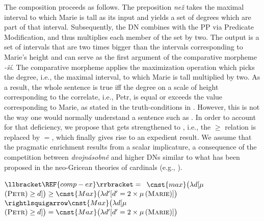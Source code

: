 \documentclass[output=paper,modfonts,hidelinks,newtxmath
\ChapterDOI{10.5281/zenodo.2545513}
]{langscibook}
\begin{document}
\begin{exe}
\ex\label{tree-comp-dvojnasobne}%
%
\end{exe}

The composition proceeds as follows. The preposition \textit{než} takes the maximal interval to which Marie is tall as its input and yields a set of degrees which are part of that interval. Subsequently, the DN combines with the PP via Predicate Modification, and thus multiplies each member of the set by two. The output is a set of intervals that are two times bigger than the intervals corresponding to Marie's height and can serve as the first argument of the comparative morpheme \textit{-ší}. The comparative morpheme applies the maximization operation  which picks the degree, i.e., the maximal interval, to which Marie is tall multiplied by two. As a result, the whole sentence is true iff the degree on a scale of height corresponding to the correlate, i.e., Petr, is equal or exceeds the value corresponding to Marie, as stated in the truth-conditions in . However, this is not the way one would normally understand a sentence such as . In order to account for that deficiency, we propose that  gets strengthened to , i.e., the $\geq$ relation is replaced by $=$, which finally gives rise to an expedient result. We assume that the pragmatic enrichment results from a scalar implicature, a consequence of the competition between \textit{dvojnásobně} and higher DNs similar to what has been proposed in the neo-Gricean theories of cardinals (e.g., \citealt{horn1972semantic}).

\ea\label{tree-comp-dvojnasobne-semantics} $\llbracket \REF{comp-ex}\rrbracket ={}$
\ea $\cnst{max}\big(\lambda d[\mu$$(\textsc{Petr})\geq d]\big) \geq \cnst{Max}\big(\lambda d'[d'=2 \times \mu$$(\textsc{Marie})]\big)$\label{tree-comp-dvojnasobne-semantics-a}
\ex $\rightlsquigarrow\cnst{Max}\big(\lambda d[\mu$$(\textsc{Petr})\geq d]\big) = \cnst{Max}\big(\lambda d'[d'=2 \times \mu$$(\textsc{Marie})]\big)$\label{tree-comp-dvojnasobne-semantics-b}
\z \z
\end{document}
